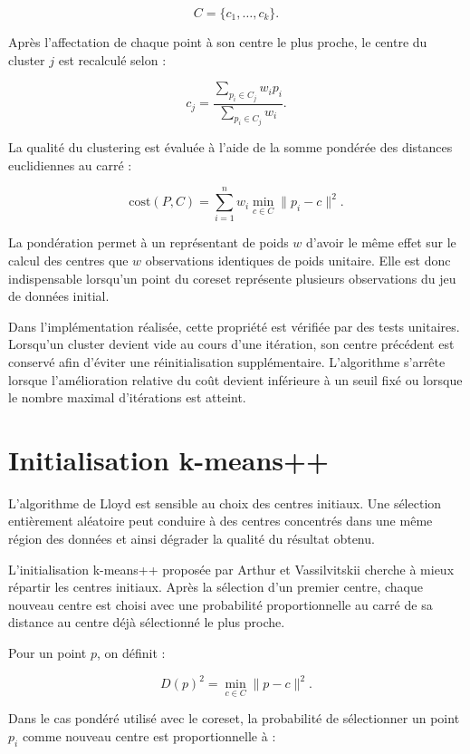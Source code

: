 \[
C = \{c_1,\ldots,c_k\}.
\]

Après l'affectation de chaque point à son centre le plus proche, le centre du cluster \(j\) est recalculé selon :

\[
c_j =
\frac{
    \sum_{p_i \in C_j} w_i p_i
}{
    \sum_{p_i \in C_j} w_i
}.
\]

La qualité du clustering est évaluée à l'aide de la somme pondérée des distances euclidiennes au carré :

\[
\mathrm{cost}(P,C)
=
\sum_{i=1}^{n}
w_i
\min_{c \in C}
\|p_i-c\|^2.
\]

La pondération permet à un représentant de poids \(w\) d'avoir le même effet sur le calcul des centres que \(w\) observations identiques de poids unitaire. Elle est donc indispensable lorsqu'un point du coreset représente plusieurs observations du jeu de données initial.

Dans l'implémentation réalisée, cette propriété est vérifiée par des tests unitaires. Lorsqu'un cluster devient vide au cours d'une itération, son centre précédent est conservé afin d'éviter une réinitialisation supplémentaire. L'algorithme s'arrête lorsque l'amélioration relative du coût devient inférieure à un seuil fixé ou lorsque le nombre maximal d'itérations est atteint.

\section{Initialisation k-means++}

L'algorithme de Lloyd est sensible au choix des centres initiaux. Une sélection entièrement aléatoire peut conduire à des centres concentrés dans une même région des données et ainsi dégrader la qualité du résultat obtenu.

L'initialisation k-means++ proposée par Arthur et Vassilvitskii \cite{arthur2007} cherche à mieux répartir les centres initiaux. Après la sélection d'un premier centre, chaque nouveau centre est choisi avec une probabilité proportionnelle au carré de sa distance au centre déjà sélectionné le plus proche.

Pour un point \(p\), on définit :

\[
D(p)^2 =
\min_{c \in C}
\|p-c\|^2.
\]

Dans le cas pondéré utilisé avec le coreset, la probabilité de sélectionner un point \(p_i\) comme nouveau centre est proportionnelle à :


